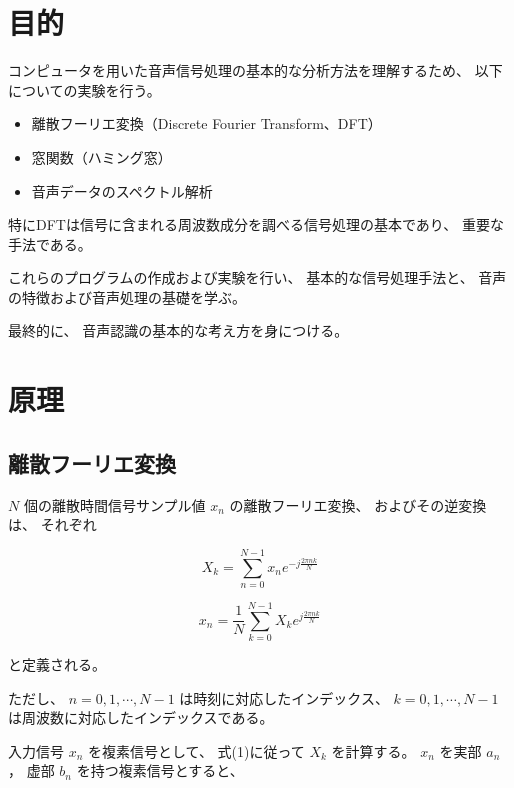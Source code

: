 \documentclass{jsarticle}
\title{}
\author{}
\date{}
\begin{document}
\maketitle


\section{目的}

コンピュータを用いた音声信号処理の基本的な分析方法を理解するため、
以下についての実験を行う。

\begin{itemize}
    \item 離散フーリエ変換（Discrete Fourier Transform、DFT）
    \item 窓関数（ハミング窓）
    \item 音声データのスペクトル解析
\end{itemize}

特にDFTは信号に含まれる周波数成分を調べる信号処理の基本であり、
重要な手法である。

これらのプログラムの作成および実験を行い、
基本的な信号処理手法と、
音声の特徴および音声処理の基礎を学ぶ。

最終的に、
音声認識の基本的な考え方を身につける。

\section{原理}

\subsection{離散フーリエ変換}

$N$ 個の離散時間信号サンプル値 $x_n$ の離散フーリエ変換、
およびその逆変換は、
それぞれ

\begin{equation}
X_k =
\sum_{n=0}^{N-1}
x_n
e^{-j\frac{2\pi nk}{N}}
\end{equation}

\begin{equation}
x_n =
\frac{1}{N}
\sum_{k=0}^{N-1}
X_k
e^{j\frac{2\pi nk}{N}}
\end{equation}

と定義される。

ただし、
$n=0,1,\cdots,N-1$ は時刻に対応したインデックス、
$k=0,1,\cdots,N-1$ は周波数に対応したインデックスである。

入力信号 $x_n$ を複素信号として、
式(1)に従って $X_k$ を計算する。
$x_n$ を実部 $a_n$，
虚部 $b_n$ を持つ複素信号とすると、
\end{document}
